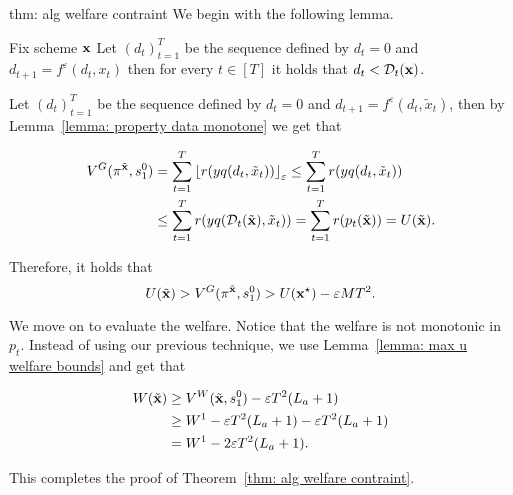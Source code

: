 \begin{proofof}{thm: alg welfare contraint}
We begin with the following lemma.

\begin{lemma} \label{lemma: alg lower data}
Fix scheme ${\bf{x}}$ Let $(d_t)_{t = 1}^T$ be the sequence defined by $d_t = 0$ and $d_{t+1} = f^\varepsilon(d_t, x_t)$ then for every $t \in [T]$ it holds that $d_t < \mathcal{D}_{t}({\bf{x}})$.
\end{lemma}

Let $(d_t)_{t = 1}^T$ be the sequence defined by $d_t = 0$ and $d_{t+1} = f^\varepsilon(d_t, \tilde{x}_t)$, then by Lemma~\ref{lemma: property data monotone} we get that

\begin{align*}
V^G(\pi^{\tilde{{\bf{x}}}}, s_1^0) &= \sum_{t = 1}^T {\left\lfloor r(yq(d_t, \tilde{x}_t))\right\rfloor_{\varepsilon}} \leq \sum_{t = 1}^T r(yq(d_t, \tilde{x}_t)) \\
& \leq \sum_{t = 1}^T r(yq(\mathcal{D}_t(\tilde{{\bf{x}}}), \tilde{x}_t)) = \sum_{t = 1}^T r(p_t(\tilde{{\bf{x}}})) = U(\tilde{{\bf{x}}}).
\end{align*}

Therefore, it holds that
\[
U(\tilde{{\bf{x}}}) > V^G(\pi^{\tilde{{\bf{x}}}}, s_1^0) > U({\bf{x}}^\star) - \varepsilon M T^2.
\]

We move on to evaluate the welfare. Notice that the welfare is not monotonic in $p_t$. Instead of using our previous technique, we use Lemma~\ref{lemma: max u welfare bounds} and get that

\begin{align*}
W(\tilde{{\bf{x}}}) &\geq V^W(\tilde{{\bf{x}}}, s_1^0) - \varepsilon T^2 (L_a+1) \\
& \geq W^1 - \varepsilon T^2 (L_a+1) - \varepsilon T^2 (L_a+1) \\
& = W^1 - 2\varepsilon T^2 (L_a+1).
\end{align*}

This completes the proof of Theorem~\ref{thm: alg welfare contraint}.
\end{proofof}







